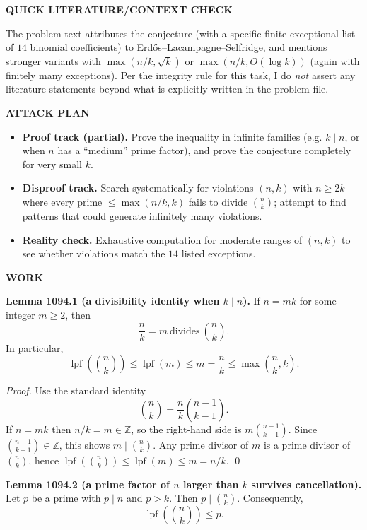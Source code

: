 \medskip
\noindent\textbf{QUICK LITERATURE/CONTEXT CHECK}

\smallskip
\noindent
The problem text attributes the conjecture (with a specific finite exceptional list of $14$ binomial coefficients) to Erd\H{o}s--Lacampagne--Selfridge, and mentions stronger variants with $\max(n/k,\sqrt{k})$ or $\max(n/k,O(\log k))$ (again with finitely many exceptions). Per the integrity rule for this task, I do \emph{not} assert any literature statements beyond what is explicitly written in the problem file.

\medskip
\noindent\textbf{ATTACK PLAN}

\smallskip
\noindent
\begin{itemize}
\item \textbf{Proof track (partial).} Prove the inequality in infinite families (e.g. $k\mid n$, or when $n$ has a ``medium'' prime factor), and prove the conjecture completely for very small $k$.
\item \textbf{Disproof track.} Search systematically for violations $(n,k)$ with $n\ge 2k$ where every prime $\le\max(n/k,k)$ fails to divide $\binom{n}{k}$; attempt to find patterns that could generate infinitely many violations.
\item \textbf{Reality check.} Exhaustive computation for moderate ranges of $(n,k)$ to see whether violations match the $14$ listed exceptions.
\end{itemize}

\medskip
\noindent\textbf{WORK}

\smallskip
\noindent\textbf{Lemma 1094.1 (a divisibility identity when $k\mid n$).}
If $n=mk$ for some integer $m\ge 2$, then
\[
\frac{n}{k}=m\ \text{divides}\ \binom{n}{k}.
\]
In particular,
\[
\operatorname{lpf}\!\left(\binom{n}{k}\right)\le \operatorname{lpf}(m)\le m=\frac{n}{k}\le \max\left(\frac{n}{k},k\right).
\]

\smallskip
\noindent\emph{Proof.}
Use the standard identity
\[
\binom{n}{k}=\frac{n}{k}\binom{n-1}{k-1}.
\]
If $n=mk$ then $n/k=m\in\mathbb{Z}$, so the right-hand side is $m\binom{n-1}{k-1}$. Since $\binom{n-1}{k-1}\in\mathbb{Z}$, this shows $m\mid\binom{n}{k}$. Any prime divisor of $m$ is a prime divisor of $\binom{n}{k}$, hence $\operatorname{lpf}(\binom{n}{k})\le \operatorname{lpf}(m)\le m=n/k$. \qed

\smallskip
\noindent\textbf{Lemma 1094.2 (a prime factor of $n$ larger than $k$ survives cancellation).}
Let $p$ be a prime with $p\mid n$ and $p>k$. Then $p\mid\binom{n}{k}$. Consequently,
\[
\operatorname{lpf}\!\left(\binom{n}{k}\right)\le p.
\]


